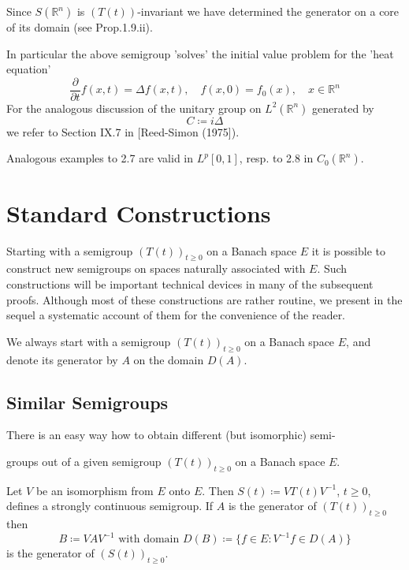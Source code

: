 Since $S(\mathbb{R}^{n})$ is $(T(t))$-invariant we have determined the generator on a core of its domain (see Prop.1.9.ii).

In particular the above semigroup 'solves' the initial value problem for the 'heat equation'
\[
    \frac{\partial}{\partial t} f(x,t) = \Delta f(x,t), \quad f(x,0) = f_{0}(x), \quad x \in \mathbb{R}^{n}
\]
For the analogous discussion of the unitary group on $L^{2}(\mathbb{R}^{n})$ generated by
\[
    C \coloneqq i\Delta
\]
we refer to Section IX.7 in [Reed-Simon (1975]).

Analogous examples to 2.7 are valid in $L^{p}[0,1]$, resp. to 2.8 in $C_{0}(\mathbb{R}^{n})$.
\section{Standard Constructions}\label{sec:a1-3}
Starting with a semigroup $(T(t))_{t \geq 0}$ on a Banach space $E$ it is possible to construct new semigroups on spaces naturally associated with $E$.
Such constructions will be important technical devices in many of the subsequent proofs.
Although most of these constructions are rather routine, we present in the sequel a systematic account of them for the convenience of the reader.

We always start with a semigroup $(T(t))_{t \geq 0}$ on a Banach space $E$, and denote its generator by $A$ on the domain $D(A)$.
\subsection{Similar Semigroups}\label{subsec:a1-3.0}
There is an easy way how to obtain different (but isomorphic) semi-

\newpage

groups out of a given semigroup $(T(t))_{t \geq 0}$ on a Banach space $E$.

Let $V$ be an isomorphism from $E$ onto $E$.
Then $S(t) \coloneqq VT(t)V^{-1}$, $t \geq 0$, defines a strongly continuous semigroup.
If $A$ is the generator of $(T(t))_{t \geq 0}$ then
\[
    B \coloneqq VAV^{-1} \text{ with domain } D(B) \coloneqq \{f \in E : V^{-1}f \in D(A)\}
\]
is the generator of $(S(t))_{t \geq 0}$.

